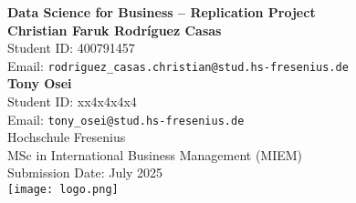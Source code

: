 \begin{titlepage}
\centering
\vspace*{4em}
{\Large\textbf{Data Science for Business – Replication Project}}\\[2em]
{\large\textbf{Christian Faruk Rodríguez Casas}}\\[0.3em]
Student ID: 400791457\\[0.3em]
Email: \texttt{rodriguez\_casas.christian@stud.hs-fresenius.de}\\[1em]
{\large\textbf{Tony Osei}}\\[0.3em]
Student ID: xx4x4x4x4\\[0.3em]
Email: \texttt{tony\_osei@stud.hs-fresenius.de}\\[1.5em]
Hochschule Fresenius\\[0.3em]
MSc in International Business Management (MIEM)\\[2em]
Submission Date: July 2025\\[2em]
\texttt{[image: logo.png]}\\[1em]
\end{titlepage}
